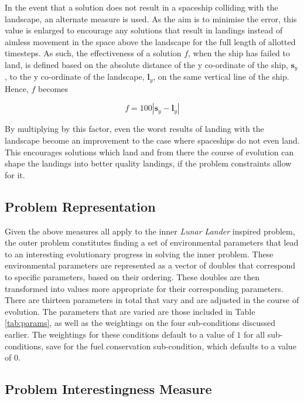 \documentclass[conference]{IEEEtran}
\begin{document}
In the event that a solution does not result in a spaceship colliding with the landscape, an alternate measure is used. As the aim is to minimise the error, this value is enlarged to encourage any solutions that result in landings instead of aimless movement in the space above the landscape for the full length of allotted timesteps. As such, the effectiveness of a solution $f$, when the ship has failed to land, is defined based on the absolute distance of the y co-ordinate of the ship, $\boldsymbol {s}_{y}$, to the y co-ordinate of the landscape, $\boldsymbol {l}_{y}$, on the same vertical line of the ship. Hence, $f$ becomes

\begin{equation}
f = 100|\boldsymbol {s}_{y} - \boldsymbol {l}_{y}|
\end{equation}

By multiplying by this factor, even the worst results of landing with the landscape become an improvement to the case where spaceships do not even land. This encourages solutions which land and from there the course of evolution can shape the landings into better quality landings, if the problem constraints allow for it.

\subsection{Problem Representation}

Given the above measures all apply to the inner {\itshape Lunar Lander} inspired problem, the outer problem constitutes finding a set of environmental parameters that lead to an interesting evolutionary progress in solving the inner problem. These environmental parameters are represented as a vector of doubles that correspond to specific parameters, based on their ordering. These doubles are then transformed into values more appropriate for their corresponding parameters. There are thirteen parameters in total that vary and are adjusted in the course of evolution.  The parameters that are varied are those included in Table \ref{tab:params}, as well as the weightings on the four sub-conditions discussed earlier. The weightings for these conditions default to a value of $1$ for all sub-conditions, save for the fuel conservation sub-condition, which defaults to a value of $0$.

\subsection{Problem Interestingness Measure}
\end{document}
